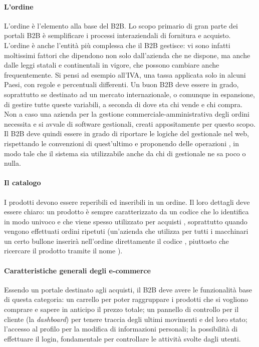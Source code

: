 \paragraph{L'ordine}
L'ordine è l'elemento alla base del B2B. Lo scopo primario di gran parte dei portali B2B è semplificare i processi interaziendali di fornitura e acquisto. L'ordine è anche l'entità più complessa che il B2B gestisce: vi sono infatti moltissimi fattori che dipendono non solo dall'azienda che ne dispone, ma anche dalle leggi statali e continentali in vigore, che possono cambiare anche frequentemente. Si pensi ad esempio all'\Gls{IVA}, una tassa applicata solo in alcuni Paesi, con regole e percentuali differenti. Un buon B2B deve essere in grado, soprattutto se destinato ad un mercato internazionale, o comunque in espansione, di gestire tutte queste variabili, a seconda di dove sta chi vende e chi compra. Non a caso una azienda per la gestione commerciale-amministrativa degli ordini necessita e si avvale di software gestionali, creati appositamente per questo scopo. Il B2B deve quindi essere in grado di riportare le logiche del gestionale nel web, rispettando le convenzioni di quest'ultimo e proponendo delle operazioni , in modo tale che il sistema sia utilizzabile anche da chi di gestionale ne sa poco o nulla.

\paragraph{Il catalogo}
I prodotti devono essere reperibili ed inseribili in un ordine. Il loro dettagli deve essere chiaro: un prodotto è sempre caratterizzato da un codice che lo identifica in modo univoco e che viene spesso utilizzato per acquisti , soprattutto quando vengono effettuati ordini ripetuti (un'azienda che utilizza per tutti i macchinari un certo bullone inserirà nell'ordine direttamente il codice , piuttosto che ricercare il prodotto tramite il nome ).

\paragraph{Caratteristiche generali degli e-commerce}
Essendo un portale destinato agli acquisti, il B2B deve avere le funzionalità base di questa categoria: un carrello per poter raggruppare i prodotti che si vogliono comprare e sapere in anticipo il prezzo totale; un pannello di controllo per il cliente (la \textit{dashboard}) per tenere traccia degli ultimi movimenti e del loro stato; l'accesso al profilo per la modifica di informazioni personali; la possibilità di effettuare il login, fondamentale per controllare le attività svolte dagli utenti.

